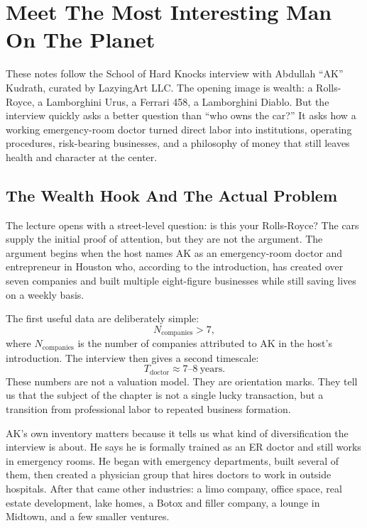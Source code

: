 \chapter{Meet The Most Interesting Man On The Planet}

These notes follow the School of Hard Knocks interview with Abdullah ``AK'' Kudrath, curated by LazyingArt LLC. The opening image is wealth: a Rolls-Royce, a Lamborghini Urus, a Ferrari 458, a Lamborghini Diablo. But the interview quickly asks a better question than ``who owns the car?'' It asks how a working emergency-room doctor turned direct labor into institutions, operating procedures, risk-bearing businesses, and a philosophy of money that still leaves health and character at the center.

\section{The Wealth Hook And The Actual Problem}

The lecture opens with a street-level question: is this your Rolls-Royce? The cars supply the initial proof of attention, but they are not the argument. The argument begins when the host names AK as an emergency-room doctor and entrepreneur in Houston who, according to the introduction, has created over seven companies and built multiple eight-figure businesses while still saving lives on a weekly basis.

The first useful data are deliberately simple:
\begin{equation}
N_{\mathrm{companies}} > 7,
\end{equation}
where \(N_{\mathrm{companies}}\) is the number of companies attributed to AK in the host's introduction. The interview then gives a second timescale:
\begin{equation}
T_{\mathrm{doctor}} \approx 7\text{--}8 \ \mathrm{years}.
\end{equation}
These numbers are not a valuation model. They are orientation marks. They tell us that the subject of the chapter is not a single lucky transaction, but a transition from professional labor to repeated business formation.

AK's own inventory matters because it tells us what kind of diversification the interview is about. He says he is formally trained as an ER doctor and still works in emergency rooms. He began with emergency departments, built several of them, then created a physician group that hires doctors to work in outside hospitals. After that came other industries: a limo company, office space, real estate development, lake homes, a Botox and filler company, a lounge in Midtown, and a few smaller ventures.

